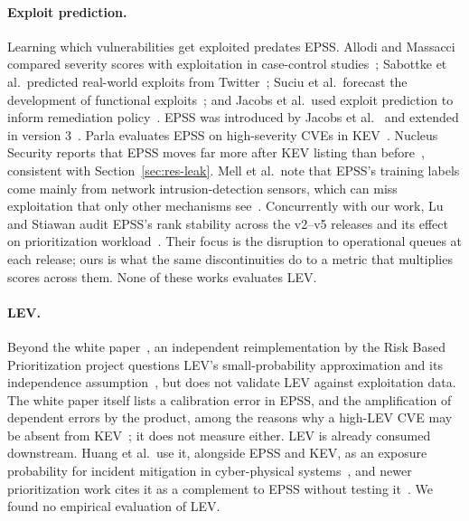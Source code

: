 \paragraph{Exploit prediction.} Learning which vulnerabilities get exploited
predates EPSS. Allodi and Massacci compared severity scores with exploitation
in case-control studies~\cite{allodi2014casecontrol}; Sabottke et al.\ predicted
real-world exploits from Twitter~\cite{sabottke2015twitter}; Suciu et al.\
forecast the development of functional exploits~\cite{suciu2022expected}; and
Jacobs et al.\ used exploit prediction to inform remediation
policy~\cite{jacobs2020remediation}. EPSS was introduced by
Jacobs et al.~\cite{jacobs2021epss} and extended in version
3~\cite{jacobs2023epssv3}. Parla evaluates EPSS on high-severity CVEs in
KEV~\cite{parla2024}. Nucleus Security reports that EPSS
moves far more after KEV listing than before~\cite{netzer2026late}, consistent
with Section~\ref{sec:res-leak}. Mell et al.\ note that EPSS's training labels
come mainly from network intrusion-detection sensors, which can miss
exploitation that only other mechanisms see~\cite{mell2024weaknesses}.
Concurrently with our work, Lu and Stiawan audit EPSS's rank stability across
the v2--v5 releases and its effect on prioritization
workload~\cite{lu2026queueshock}. Their focus is the disruption to operational
queues at each release; ours is what the same discontinuities do to a metric
that multiplies scores across them. None of these works evaluates LEV.

\paragraph{LEV.} Beyond the white paper~\cite{mell2025lev}, an independent
reimplementation by the Risk Based Prioritization project questions LEV's
small-probability approximation and its independence
assumption~\cite{rbp2025lev}, but does not validate LEV against exploitation
data. The white paper itself lists a calibration error in EPSS, and the
amplification of dependent errors by the product, among the reasons why a
high-LEV CVE may be absent from KEV~\cite[Sec.~8]{mell2025lev}; it does not
measure either. LEV is already consumed downstream. Huang et al.\ use it, alongside EPSS
and KEV, as an exposure probability for incident mitigation in cyber-physical
systems~\cite{huang2026cps}, and newer prioritization work cites it as a
complement to EPSS without testing it~\cite{akhoundali2026gpm}. We found no
empirical evaluation of LEV.

